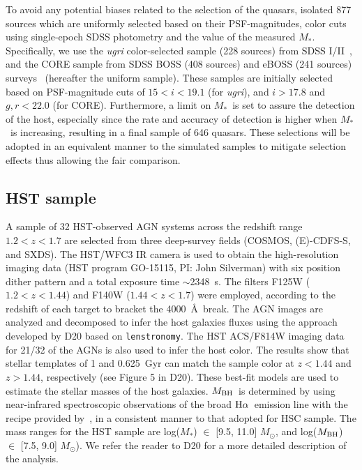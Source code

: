 \documentclass[twocolumn]{aastex631}
\def\smass{{$M_*$}}
\def\halpha{${\rm H}\alpha$}
\def\mbh{$M_{\rm BH}$}
\begin{document}
To avoid any potential biases related to the selection of the quasars, \citet{Li2021b} isolated 877 sources which are uniformly selected based on their PSF-magnitudes, color cuts using single-epoch SDSS photometry and the value of the measured \smass. Specifically, we use the {\it ugri} color-selected sample (228 sources) from SDSS I/II~\citep{Richards2002}, and the CORE sample from SDSS BOSS (408 sources) and eBOSS (241 sources) surveys~\citep{Ross2013, Myers2015} (hereafter the uniform sample). These samples are initially selected based on PSF-magnitude cuts of $15 < i < 19.1$ (for {\it ugri}), and $i > 17.8$ and $g, r < 22.0$ (for CORE). Furthermore, a limit on \smass\ is set to assure the detection of the host, especially since the rate and accuracy of detection is higher when \smass\ is increasing, resulting in a final sample of 646 quasars. These selections will be adopted in an equivalent manner to the simulated samples to mitigate selection effects thus allowing the fair comparison.

\subsection{HST sample}

A sample of 32 HST-observed AGN systems across the redshift range $1.2<z<1.7$ are selected from three deep-survey fields (COSMOS, (E)-CDFS-S, and SXDS). The HST/WFC3 IR camera is used to obtain the high-resolution imaging data (HST program GO-15115, PI: John Silverman) with six position dither pattern and a total exposure time $\sim$2348~s. The filters F125W ($1.2<z<1.44$) and F140W ($1.44<z<1.7$) were employed, according to the redshift of each target to bracket the 4000~\AA~break.  The AGN images are analyzed and decomposed to infer the host galaxies fluxes using the approach developed by D20 based on {\tt lenstronomy}. The HST ACS/F814W imaging data for 21/32 of the AGNs is also used to infer the host color. The results show that stellar templates of 1 and 0.625~Gyr can match the sample color at $z<1.44$ and $z>1.44$, respectively (see Figure 5 in D20). These best-fit models are used to estimate the stellar masses of the host galaxies. \mbh\ is determined by \citet{Schulze2018} using near-infrared spectroscopic observations of the broad \halpha\ emission line with the recipe provided by~\citet{Vestergaard2006}, in a consistent manner to that adopted for HSC sample. The mass ranges for the HST sample are log(\smass) $\in$ [9.5, 11.0] $M_{\odot}$, and log(\mbh) $\in$  [7.5, 9.0] $M_{\odot}$).
 We refer the reader to D20 for a more detailed description of the analysis. 
\end{document}
